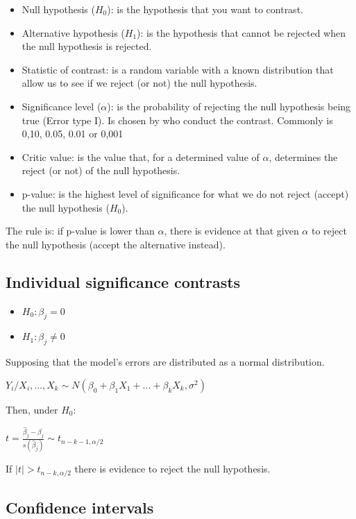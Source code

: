 \documentclass[10pt,landscape]{article}
\begin{document}
\begin{multicols}{3}
\begin{itemize}
\item Null hypothesis ($H_0$): is the hypothesis that you want to contrast.
\item Alternative hypothesis ($H_1$): is the hypothesis that cannot be rejected when the null hypothesis is rejected.
\item Statistic of contrast: is a random variable with a known distribution that allow us to see if we reject (or not) the null hypothesis.
\item Significance level ($\alpha$): is the probability of rejecting the null hypothesis being true (Error type I). Is chosen by who conduct the contrast. Commonly is 0,10, 0.05, 0.01 or 0,001
\item Critic value: is the value that, for a determined value of $\alpha$, determines the reject (or not) of the null hypothesis.
\item p-value: is the highest level of significance for what we do not reject (accept) the null hypothesis ($H_0$).
\end{itemize}

The rule is: if p-value is lower than $\alpha$, there is evidence at that given $\alpha$ to reject the null hypothesis (accept the alternative instead).

\subsection*{Individual significance contrasts}

\begin{itemize}
\item $H_0: \beta_j = 0$
\item $H_1: \beta_j \neq 0$
\end{itemize}

Supposing that the model's errors are distributed as a normal distribution.

$Y_i / X_i, ..., X_k \sim N(\beta_0 + \beta_1 X_1 + ... + \beta_k X_k, \sigma^2)$

Then, under $H_0$:

$t = \frac{\hat{\beta}_j - \beta_j}{s(\hat{\beta}_j)} \sim t_{n-k-1, \alpha/2}$

If $\mid t \mid > t_{n-k, \alpha/2}$ there is evidence to reject the null hypothesis.

\subsection*{Confidence intervals}


\end{multicols}
\end{document}
